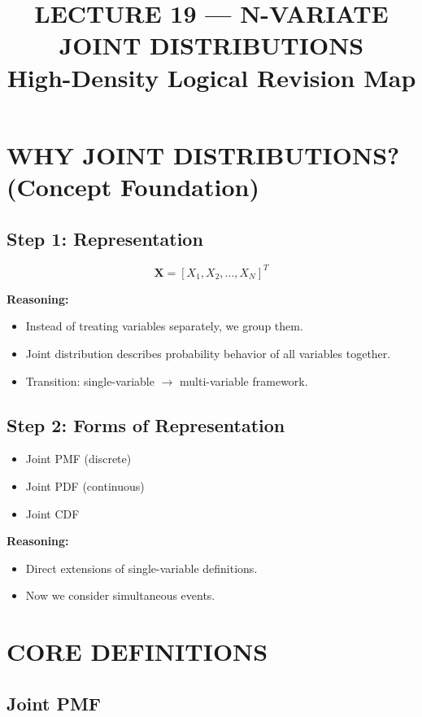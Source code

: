 \documentclass[12pt]{article}
\title{LECTURE 19 — N-VARIATE JOINT DISTRIBUTIONS\\
\large High-Density Logical Revision Map}
\author{}
\date{}
\begin{document}
\maketitle

\section{WHY JOINT DISTRIBUTIONS? (Concept Foundation)}

\subsection*{Step 1: Representation}

\[
\mathbf{X} = [X_1, X_2, \dots, X_N]^T
\]

\textbf{Reasoning:}
\begin{itemize}
    \item Instead of treating variables separately, we group them.
    \item Joint distribution describes probability behavior of all variables together.
    \item Transition: single-variable $\rightarrow$ multi-variable framework.
\end{itemize}

\subsection*{Step 2: Forms of Representation}

\begin{itemize}
    \item Joint PMF (discrete)
    \item Joint PDF (continuous)
    \item Joint CDF
\end{itemize}

\textbf{Reasoning:}
\begin{itemize}
    \item Direct extensions of single-variable definitions.
    \item Now we consider simultaneous events.
\end{itemize}

\section{CORE DEFINITIONS}

\subsection{Joint PMF}
\end{document}
